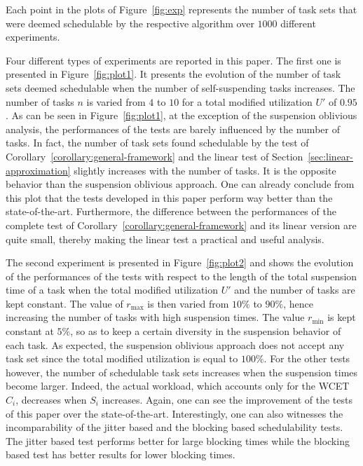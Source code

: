 Each point in the plots of Figure~\ref{fig:exp} represents the number of task sets that were deemed schedulable by the respective algorithm over $1000$ different experiments.

Four different types of experiments are reported in this paper. The first one is presented in Figure~\ref{fig:plot1}. It presents the evolution of the number of task sets deemed schedulable when the number of self-suspending tasks increases. The number of tasks $n$ is varied from $4$ to $10$ for a total modified utilization $U'$ of $0.95$. As can be seen in Figure~\ref{fig:plot1}, at the exception of the suspension oblivious analysis, the performances of the tests are barely influenced by the number of tasks. In fact, the number of task sets found schedulable by the test of Corollary~\ref{corollary:general-framework} and the linear test of Section~\ref{sec:linear-approximation} slightly increases with the number of tasks. It is the opposite behavior than the suspension oblivious approach. One can already conclude from this plot that the tests developed in this paper perform way better than the state-of-the-art. Furthermore, the difference between the performances of the complete test of Corollary~\ref{corollary:general-framework} and its linear version are quite small, thereby making the linear test a practical and useful analysis.

The second experiment is presented in Figure~\ref{fig:plot2} and shows the evolution of the performances of the tests with respect to the length of the total suspension time of a task when the total modified utilization $U'$ and the number of tasks are kept constant. The value of $r_{\max}$ is then varied from $10\%$ to $90\%$, hence increasing the number of tasks with high suspension times. The value $r_{\min}$ is kept constant at $5\%$, so as to keep a certain diversity in the suspension behavior of each task. As expected, the suspension oblivious approach does not accept any task set since the total modified utilization is equal to $100\%$. For the other tests however, the number of schedulable task sets increases when the suspension times become larger. Indeed, the actual workload, which accounts only for the WCET $C_i$, decreases when $S_i$ increases. Again, one can see the improvement of the tests of this paper over the state-of-the-art. Interestingly, one can also witnesses the incomparability of the jitter based and the blocking based schedulability tests. The jitter based test performs better for large blocking times while the blocking based test has better results for lower blocking times.

